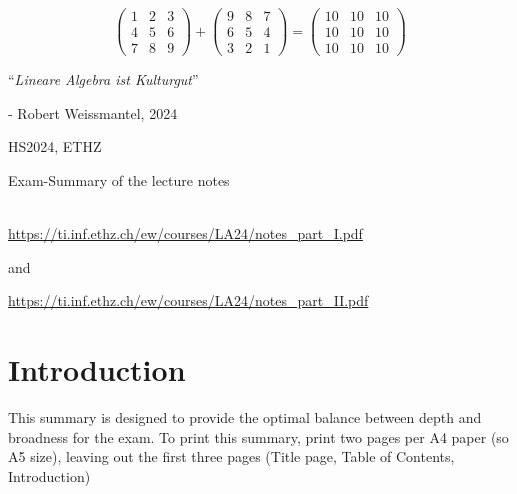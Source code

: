 \documentclass{article}
\begin{document}
\startDocument
\usetcolorboxes
\setcounter{section}{-1}
\setcounter{numberingConfig}{3}

\vspace{3cm}
\begin{Huge}
    \[
        \begin{pmatrix}
            1 & 2 & 3\\
            4 & 5 & 6\\
            7 & 8 & 9
        \end{pmatrix} + 
        \begin{pmatrix}
            9 & 8 & 7\\
            6 & 5 & 4\\
            3 & 2 & 1
        \end{pmatrix} =
        \begin{pmatrix}
            10 & 10 & 10\\
            10 & 10 & 10\\
            10 & 10 & 10
        \end{pmatrix}
    \]
\end{Huge}

\vspace{3cm}
\begin{center}
    \begin{Large}
        ``\textit{Lineare Algebra ist Kulturgut}''
    \end{Large}

    \hspace{3cm} - Robert Weissmantel, 2024
\end{center}

\vspace{3cm}
\begin{center}
    HS2024, ETHZ\\[0.2cm]
    \begin{Large}
        Exam-Summary of the lecture notes
    \end{Large}\\[0.2cm]
    \url{https://ti.inf.ethz.ch/ew/courses/LA24/notes_part_I.pdf} 
    
    and 

    \url{https://ti.inf.ethz.ch/ew/courses/LA24/notes_part_II.pdf}
\end{center}
\newpage

\newpage
\newsection
\section{Introduction}
This summary is designed to provide the optimal balance between depth and broadness for the exam. To print this summary, print two pages per A4 paper (so A5 size), leaving out the first three pages (Title page, Table of Contents, Introduction)
\end{document}
